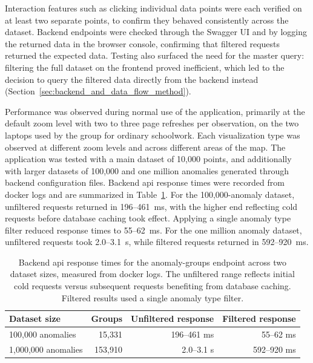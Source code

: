 Interaction features such as clicking individual data points were each verified on at least two separate points, to confirm they behaved consistently across the dataset. Backend endpoints were checked through the Swagger UI and by logging the returned data in the browser console, confirming that filtered requests returned the expected data. Testing also surfaced the need for the master query: filtering the full dataset on the frontend proved inefficient, which led to the decision to query the filtered data directly from the backend instead (Section~\ref{sec:backend_and_data_flow_method}).

Performance was observed during normal use of the application, primarily at the default zoom level with two to three page refreshes per observation, on the two laptops used by the group for ordinary schoolwork. Each visualization type was observed at different zoom levels and across different areas of the map. The application was tested with a main dataset of 10,000 points, and additionally with larger datasets of 100,000 and one million anomalies generated through backend configuration files. Backend \acrshort{api} response times were recorded from \gls{docker} logs and are summarized in Table~\ref{tab:api_response_times}. For the 100,000-anomaly dataset, unfiltered requests returned in 196--461~ms, with the higher end reflecting cold requests before database caching took effect. Applying a single anomaly type filter reduced response times to 55--62~ms. For the one million anomaly dataset, unfiltered requests took 2.0--3.1~s, while filtered requests returned in 592--920~ms.

\begin{table}[H]
\centering
\begin{tabular}{l r r r}
\toprule
\textbf{Dataset size} & \textbf{Groups} & \textbf{Unfiltered response} & \textbf{Filtered response} \\
\midrule
100,000 anomalies  & 15,331  & 196--461 ms & 55--62 ms \\
1,000,000 anomalies & 153,910 & 2.0--3.1 s  & 592--920 ms \\
\bottomrule
\end{tabular}
\caption[Backend API response times]{Backend \acrshort{api} response times for the anomaly-groups endpoint across two dataset sizes, measured from \gls{docker} logs. The unfiltered range reflects initial cold requests versus subsequent requests benefiting from database caching. Filtered results used a single anomaly type filter.}
\label{tab:api_response_times}
\end{table}

